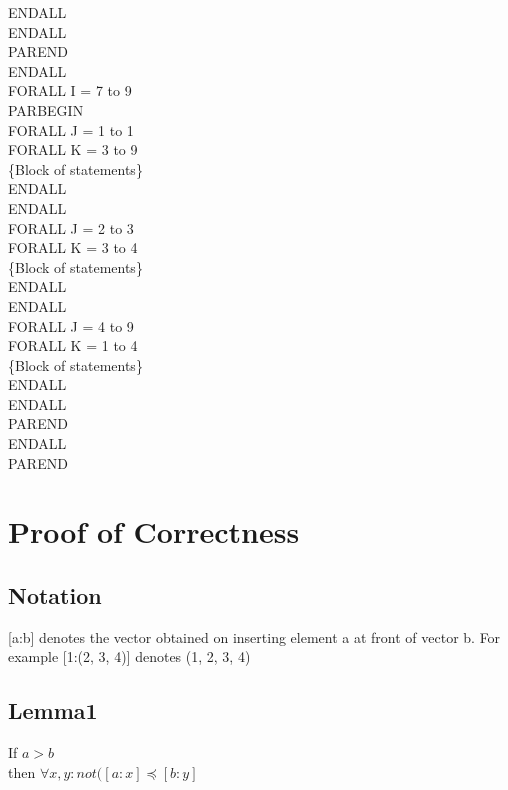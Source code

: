 \indent \indent ENDALL\\
\indent ENDALL\\
\indent PAREND\\
ENDALL\\
FORALL I = 7 to 9\\
\indent PARBEGIN\\
\indent FORALL J = 1 to 1\\
\indent \indent FORALL K = 3 to 9\\
\indent \indent \indent \{Block of statements\}\\
\indent \indent ENDALL\\
\indent ENDALL\\
\indent FORALL J = 2 to 3\\
\indent \indent FORALL K = 3 to 4\\
\indent \indent \indent \{Block of statements\}\\
\indent \indent ENDALL\\
\indent ENDALL\\
\indent FORALL J = 4 to 9\\
\indent \indent FORALL K = 1 to 4\\
\indent \indent \indent \{Block of statements\}\\
\indent \indent ENDALL\\
\indent ENDALL\\
\indent PAREND\\
ENDALL\\
PAREND\\





\section{Proof of Correctness}

\subsection{Notation}

[a:b] denotes the vector obtained on inserting element a at front of vector b.
For example [1:(2, 3, 4)] denotes (1, 2, 3, 4)

\subsection{Lemma1}
If $a > b$ \\
then $\forall x, y: not([a:x] \preceq [b:y]$\\

